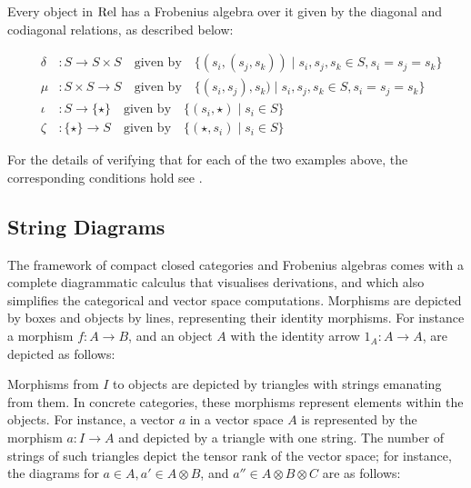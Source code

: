 \documentclass[a4paper,11pt]{easychair}
\begin{document}
Every object in $\mathrm{Rel}$  has a
Frobenius algebra over it given by the diagonal and codiagonal
relations, as described below: 



\begin{eqnarray*}
&\delta &\colon   S \to S \times S \quad \mbox{given by} \quad
\{(s_i, (s_j, s_k)) \mid s_i, s_j, s_k \in S, s_i = s_j  = s_k\}\\
& \mu & \colon   S \times S \to S
\quad \mbox{given by} \quad 
\{(s_i, s_j), s_k) \mid s_i, s_j, s_k\in S, s_i = s_j= s_k\}\\
& \iota& \colon S \to  \{\star\}    \quad \mbox{given by} \quad \{(s_i, \star) \mid s_i \in S\}\\
&\zeta& \colon  \{\star\}  \to S  \quad \mbox{given by} \quad \{(\star, s_i) \mid s_i \in S\}
\end{eqnarray*}

For the details of verifying that for each of the two examples above,  the corresponding conditions hold see \cite{CoeckePaq}. 

\subsection{String Diagrams} 
\label{string}

The framework of compact closed categories and Frobenius algebras
comes with a complete diagrammatic calculus that visualises
derivations, and which also simplifies the
categorical and vector space computations. Morphisms are depicted by
boxes and objects by lines, representing their identity morphisms. For
instance a morphism $f \colon A \to B$, and an object $A$ with the
identity arrow $1_A \colon A \to A$, are depicted as follows:

\begin{center}
\end{center}

Morphisms from $I$ to objects are depicted by triangles with strings emanating from them. In concrete categories, these morphisms represent  elements within the  objects. For instance, a vector  $a$ in a vector space $A$ is represented by the morphism $a: I \to A$ and depicted by a  triangle with one string. The number of strings of such triangles depict the tensor rank of the vector space; for instance, the
diagrams for ${a} \in A, {a'} \in A \otimes B$, and ${a''}
\in A \otimes B \otimes C$ are as follows:

\begin{center}
\end{center} 
\end{document}
